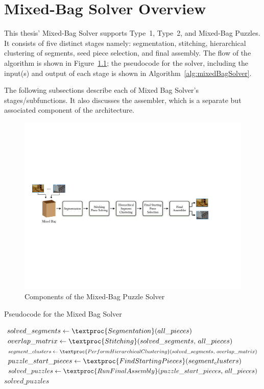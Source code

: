 \chapter{Mixed-Bag Solver Overview}

This thesis' Mixed-Bag Solver supports Type~1, Type~2, and Mixed-Bag Puzzles.  It consists of five distinct stages namely: segmentation, stitching, hierarchical clustering of segments, seed piece selection, and final assembly.  The flow of the algorithm is shown in Figure~\ref{fig:multipuzzleSolverArchitecture}; the pseudocode for the solver, including the input(s) and output of each stage is shown in Algorithm~\ref{alg:mixedBagSolver}.

The following subsections describe each of Mixed Bag Solver's stages/subfunctions.  It also discusses the assembler, which is a separate but associated component of the architecture.

\begin{figure}[ht!]
	\centering
		\includegraphics[width=1.0\textwidth]{images/cropped_algorithm_structure_overview.pdf}
	\caption{Components of the Mixed-Bag Puzzle Solver}\label{fig:multipuzzleSolverArchitecture}
\end{figure}

\begin{algorithm}
\caption{Pseudocode for the Mixed Bag Solver}\label{alg:mixedBagSolver}
\begin{algorithmic}[1]
    \State $solved\_segments \gets \textproc{Segmentation}\text{(} all\_pieces \text{)}$
	\State $overlap\_matrix \gets \textproc{Stitching}\text{(} solved\_segments \text{, } all\_pieces \text{)}$
	\State $segment\_clusters \gets \textproc{PerformHierarchicalClustering} \text{(} solved\_segments \text{, } overlap\_matrix \text{)}$
	\State $puzzle\_start\_pieces \gets \textproc{FindStartingPieces} \text{(} segment_clusters \text{)}$
	\State $solved\_puzzles \gets \textproc{RunFinalAssembly} \text{(} puzzle\_start\_pieces \text{, } all\_pieces \text{)}$
    \State \Return $solved\_puzzles$
\EndFunction
\end{algorithmic}
\end{algorithm}

